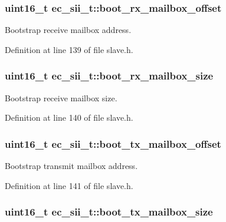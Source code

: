\subsubsection[{boot\-\_\-rx\-\_\-mailbox\-\_\-offset}]{\setlength{\rightskip}{0pt plus 5cm}uint16\-\_\-t ec\-\_\-sii\-\_\-t\-::boot\-\_\-rx\-\_\-mailbox\-\_\-offset}\label{structec__sii__t_abdcbea468841ca94492bae78207b1282}


Bootstrap receive mailbox address. 



Definition at line 139 of file slave.\-h.

\subsubsection[{boot\-\_\-rx\-\_\-mailbox\-\_\-size}]{\setlength{\rightskip}{0pt plus 5cm}uint16\-\_\-t ec\-\_\-sii\-\_\-t\-::boot\-\_\-rx\-\_\-mailbox\-\_\-size}\label{structec__sii__t_aa5e4828a5bb2ea45194de12fe48608ed}


Bootstrap receive mailbox size. 



Definition at line 140 of file slave.\-h.

\subsubsection[{boot\-\_\-tx\-\_\-mailbox\-\_\-offset}]{\setlength{\rightskip}{0pt plus 5cm}uint16\-\_\-t ec\-\_\-sii\-\_\-t\-::boot\-\_\-tx\-\_\-mailbox\-\_\-offset}\label{structec__sii__t_a91d2fc76e5e4b634e130aa9e51e71bfc}


Bootstrap transmit mailbox address. 



Definition at line 141 of file slave.\-h.

\subsubsection[{boot\-\_\-tx\-\_\-mailbox\-\_\-size}]{\setlength{\rightskip}{0pt plus 5cm}uint16\-\_\-t ec\-\_\-sii\-\_\-t\-::boot\-\_\-tx\-\_\-mailbox\-\_\-size}\label{structec__sii__t_a65ead35255e661f345c9d15033347b10}


